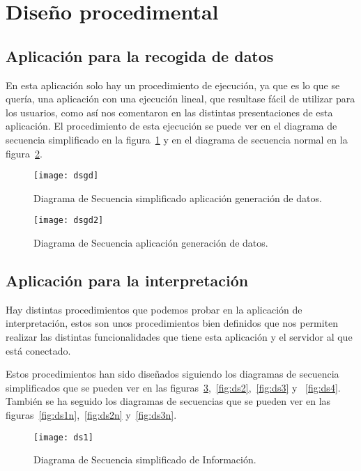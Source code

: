 \section{Diseño procedimental}
\subsection{Aplicación para la recogida de datos}
En esta aplicación solo hay un procedimiento de ejecución, ya que es lo que se quería, una aplicación con una ejecución lineal, que resultase fácil de utilizar para los usuarios, como así nos comentaron en las distintas presentaciones de esta aplicación. El procedimiento de esta ejecución se puede ver en el diagrama de secuencia simplificado en la figura~\ref{fig:dsgd} y en el diagrama de secuencia normal en la figura~\ref{fig:dsgd2}.

\begin{figure}[H]
	\centering
	\texttt{[image: dsgd]}
	\caption{Diagrama de Secuencia simplificado aplicación generación de datos.}
	\label{fig:dsgd}
\end{figure}

\begin{figure}[H]
	\centering
	\texttt{[image: dsgd2]}
	\caption{Diagrama de Secuencia aplicación generación de datos.}
	\label{fig:dsgd2}
\end{figure}

\subsection{Aplicación para la interpretación}
Hay distintas procedimientos que podemos probar en la aplicación de interpretación, estos son unos procedimientos bien definidos que nos permiten realizar las distintas funcionalidades que tiene esta aplicación y el servidor al que está conectado.

Estos procedimientos han sido diseñados siguiendo los diagramas de secuencia simplificados que se pueden ver en las figuras~\ref{fig:ds1},~\ref{fig:ds2},~\ref{fig:ds3} y ~\ref{fig:ds4}. También se ha seguido los diagramas de secuencias que se pueden ver en las figuras~\ref{fig:ds1n},~\ref{fig:ds2n} y~\ref{fig:ds3n}.

\begin{figure}[htp]
	\centering
	\texttt{[image: ds1]}
	\caption{Diagrama de Secuencia simplificado de Información.}
	\label{fig:ds1}
\end{figure}

